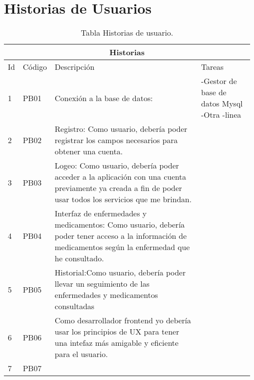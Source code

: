 \chapter{Historias de Usuarios}


\begin{table}[htb]
	\centering
	\begin{tabular}{|l|p{2cm}|p{10cm}|p{3cm}|}
		\hline
		\multicolumn{4}{|c|}{Historias} \\ \hline
		Id & Código & Descripción & Tareas\\
		\hline \hline
		1 & PB01  &  Conexión a la base de datos: & -Gestor de base de datos Mysql \newline -Otra -linea \\ \hline
		
		2 & PB02  & Registro: Como usuario, debería poder registrar los campos necesarios para obtener una cuenta.& \\ \hline
		
		3 & PB03  & Logeo: Como usuario, debería poder acceder a la aplicación con una cuenta previamente ya creada a fin de poder usar todos los servicios que me brindan. &  \\ \hline
		
		4 & PB04 & Interfaz de enfermedades y medicamentos: 
		Como usuario, debería poder tener acceso a la información de medicamentos según la enfermedad que he consultado. &  \\ \hline
		
		5 & PB05  & Historial:Como usuario, debería poder llevar un seguimiento de las enfermedades y medicamentos consultadas &\\ \hline
		
		6 & PB06  & Como desarrollador frontend yo debería usar los 
		principios de UX para tener una intefaz más amigable 
		y eficiente para el usuario.& 
		 \\ \hline
		
		7 & PB07  &  &
		\\ \hline
	\end{tabular}
	\caption{Tabla Historias de usuario.}
	\label{tabla:Historial}
\end{table}